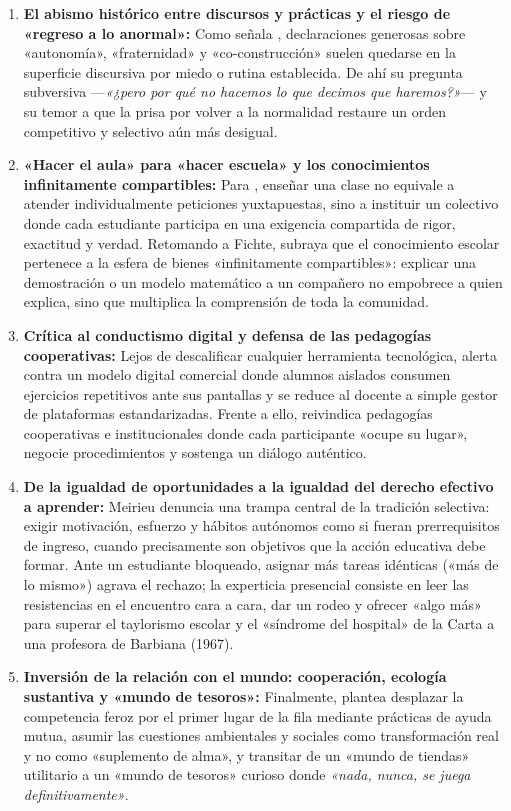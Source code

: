 \documentclass[spanish,letterpaper,oneside]{article}
\begin{document}
\begin{enumerate}
  \item \textbf{El abismo histórico entre discursos y prácticas y el riesgo de «regreso a lo anormal»:} Como señala \citet{meirieu2020escuela}, declaraciones generosas sobre «autonomía», «fraternidad» y «co-construcción» suelen quedarse en la superficie discursiva por miedo o rutina establecida. De ahí su pregunta subversiva —\textit{«¿pero por qué no hacemos lo que decimos que haremos?»}— y su temor a que la prisa por volver a la normalidad restaure un orden competitivo y selectivo aún más desigual.
  \item \textbf{«Hacer el aula» para «hacer escuela» y los conocimientos infinitamente compartibles:} Para \citet{meirieu2020escuela}, enseñar una clase no equivale a atender individualmente peticiones yuxtapuestas, sino a instituir un colectivo donde cada estudiante participa en una exigencia compartida de rigor, exactitud y verdad. Retomando a Fichte, subraya que el conocimiento escolar pertenece a la esfera de bienes «infinitamente compartibles»: explicar una demostración o un modelo matemático a un compañero no empobrece a quien explica, sino que multiplica la comprensión de toda la comunidad.
  \item \textbf{Crítica al conductismo digital y defensa de las pedagogías cooperativas:} Lejos de descalificar cualquier herramienta tecnológica, \citet{meirieu2020escuela} alerta contra un modelo digital comercial donde alumnos aislados consumen ejercicios repetitivos ante sus pantallas y se reduce al docente a simple gestor de plataformas estandarizadas. Frente a ello, reivindica pedagogías cooperativas e institucionales donde cada participante «ocupe su lugar», negocie procedimientos y sostenga un diálogo auténtico.
  \item \textbf{De la igualdad de oportunidades a la igualdad del derecho efectivo a aprender:} Meirieu denuncia una trampa central de la tradición selectiva: exigir motivación, esfuerzo y hábitos autónomos como si fueran prerrequisitos de ingreso, cuando precisamente son objetivos que la acción educativa debe formar. Ante un estudiante bloqueado, asignar más tareas idénticas («más de lo mismo») agrava el rechazo; la experticia presencial consiste en leer las resistencias en el encuentro cara a cara, dar un rodeo y ofrecer «algo más» para superar el taylorismo escolar y el «síndrome del hospital» de la Carta a una profesora de Barbiana (1967).
  \item \textbf{Inversión de la relación con el mundo: cooperación, ecología sustantiva y «mundo de tesoros»:} Finalmente, \citet{meirieu2020escuela} plantea desplazar la competencia feroz por el primer lugar de la fila mediante prácticas de ayuda mutua, asumir las cuestiones ambientales y sociales como transformación real y no como «suplemento de alma», y transitar de un «mundo de tiendas» utilitario a un «mundo de tesoros» curioso donde \textit{«nada, nunca, se juega definitivamente»}.
\end{enumerate}
\end{document}
